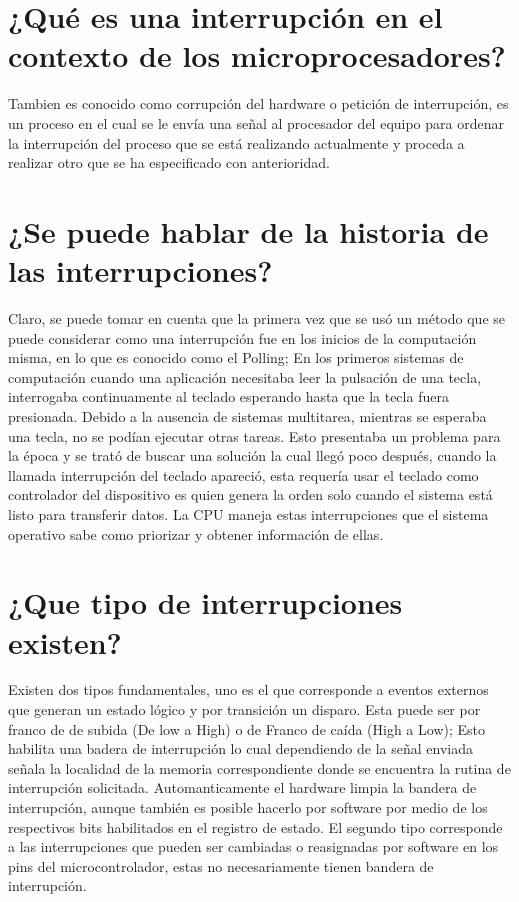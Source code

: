 \documentclass{article}
\begin{document}
\newpage
\Large
\section{¿Qué es una interrupción en el contexto de los microprocesadores?}

Tambien es conocido como corrupción del hardware o petición de interrupción, es un proceso en el cual se le envía una señal al procesador del equipo para ordenar la interrupción del proceso que se está realizando actualmente y proceda a realizar otro que se ha especificado con anterioridad. 



\section{¿Se puede hablar de la historia de las interrupciones?}
Claro, se puede tomar en cuenta que la primera vez que se usó un método que se puede considerar como una interrupción fue en los inicios de la computación misma, en lo que es conocido como el Polling; En los primeros sistemas de computación cuando una aplicación necesitaba leer la pulsación de una tecla, interrogaba continuamente al teclado esperando hasta que la tecla fuera presionada. Debido a la ausencia de sistemas multitarea, mientras se esperaba una tecla, no se podían ejecutar otras tareas. Esto presentaba un problema para la época y se trató de buscar una solución la cual llegó poco después, cuando la llamada interrupción del teclado apareció, esta requería usar el teclado como controlador del dispositivo es quien genera la orden solo cuando el sistema está listo para transferir datos. La CPU maneja estas interrupciones que el sistema operativo sabe como priorizar y obtener información de ellas.
\section{¿Que tipo de interrupciones existen?}
Existen dos tipos fundamentales, uno  es el que corresponde a eventos externos que generan un estado lógico y por transición un disparo. Esta puede ser por franco de de subida (De low a High) o de Franco de caída (High a Low); Esto habilita una badera de interrupción lo cual dependiendo de la señal enviada señala la localidad de la memoria correspondiente donde se encuentra la rutina de interrupción solicitada. 
\newline
Automanticamente el hardware limpia la bandera de interrupción, aunque también es posible hacerlo por software por medio de los respectivos bits habilitados en el registro de estado. 
\newline
El segundo tipo corresponde a las interrupciones que pueden ser cambiadas o reasignadas por software en los pins del microcontrolador, estas no necesariamente tienen bandera de interrupción. 
\end{document}

